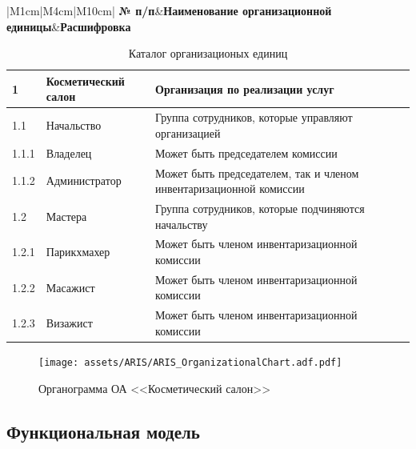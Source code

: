 \begin{table}[h!]
    \centering

    \footnotesize

    \caption{Каталог организационых единиц}

    \label{table:ARIS_OrganizationalСhart}

    \begin{tabular}{|M{1cm}|M{4cm}|M{10cm}|} 
        \hline
        \textbf{№ п/п}&\textbf{Наименование организационной единицы}&\textbf{Расшифровка}\\ \hline
    \end{tabular}

    \begin{tabular}{|p{1cm}|p{4cm}|p{10cm}|} 
        \hline
        1       &Косметический салон    &Организация по реализации услуг\\ \hline
        1.1     &Начальство             &Группа сотрудников, которые управляют организацией\\ \hline
        1.1.1   &Владелец               &Может быть председателем комиссии\\ \hline
        1.1.2   &Администратор          &Может быть председателем, так и членом инвентаризационной комиссии\\ \hline
        1.2     &Мастера                &Группа сотрудников, которые подчиняются начальству\\ \hline
        1.2.1   &Парикхмахер            &Может быть членом инвентаризационной комиссии\\ \hline
        1.2.2   &Масажист               &Может быть членом инвентаризационной комиссии\\ \hline
        1.2.3   &Визажист               &Может быть членом инвентаризационной комиссии\\ \hline
    \end{tabular}
\end{table}

\begin{figure}[!h]
    \centering
    \texttt{[image: assets/ARIS/ARIS\_OrganizationalСhart.adf.pdf]}
    \caption{Органограмма ОА <<Косметический салон>>}
    \label{fig:ARIS_OrganizationalСhart}
\end{figure}

\newpage
\subsection{Функциональная модель}

